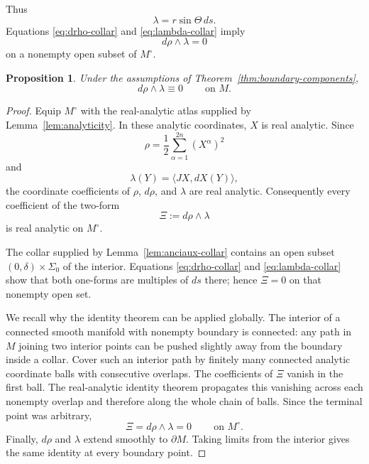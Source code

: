 \documentclass[11pt,a4paper]{article}
\numberwithin{equation}{section}
\newtheorem{proposition}[theorem]{Proposition}
\begin{document}
Thus
\begin{equation}\label{eq:lambda-collar}
        \lambda=r\sin\Theta\,ds.
\end{equation}
Equations \eqref{eq:drho-collar} and \eqref{eq:lambda-collar} imply
\begin{equation}
        d\rho\wedge\lambda=0
\end{equation}
on a nonempty open subset of $M^\circ$.

\begin{proposition}\label{prop:global-rank-one}
Under the assumptions of Theorem~\ref{thm:boundary-components},
\begin{equation}
        d\rho\wedge\lambda\equiv0
        \qquad\ \text{on }M.
\end{equation}
\end{proposition}

\begin{proof}
Equip $M^\circ$ with the real-analytic atlas supplied by
Lemma~\ref{lem:analyticity}.  In these analytic coordinates, $X$ is real
analytic.  Since
$$
        \rho=\frac12\sum_{\alpha=1}^{2n}(X^\alpha)^2
$$
and
$$
        \lambda(Y)=\langle JX,dX(Y)\rangle,
$$
the coordinate coefficients of $\rho$, $d\rho$, and $\lambda$ are real
analytic.  Consequently every coefficient of the two-form
$$
        \Xi:=d\rho\wedge\lambda
$$
is real analytic on $M^\circ$.

The collar supplied by Lemma~\ref{lem:anciaux-collar} contains an open subset
$(0,\delta)\times\Sigma_0$ of the interior.  Equations
\eqref{eq:drho-collar} and \eqref{eq:lambda-collar} show that both one-forms are
multiples of $ds$ there; hence $\Xi=0$ on that nonempty open set.

We recall why the identity theorem can be applied globally.  The interior of a
connected smooth manifold with nonempty boundary is connected: any path in
$M$ joining two interior points can be pushed slightly away from the boundary
inside a collar.  Cover such an interior path by finitely many connected
analytic coordinate balls with consecutive overlaps.  The coefficients of
$\Xi$ vanish in the first ball.  The real-analytic identity theorem
\cite[Section~1.2]{KrantzParks2002} propagates this vanishing across each
nonempty overlap and therefore along the whole chain of balls.  Since the
terminal point was arbitrary,
$$
        \Xi=d\rho\wedge\lambda=0
        \qquad\ \text{on }M^\circ.
$$
Finally, $d\rho$ and $\lambda$ extend smoothly to $\partial M$.  Taking limits
from the interior gives the same identity at every boundary point.
\end{proof}
\end{document}
